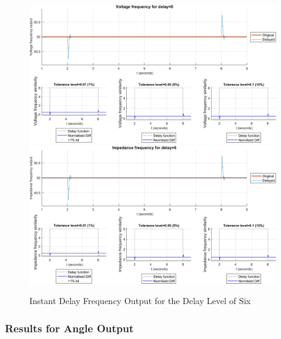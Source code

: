 \begin{figure}
    \caption{Instant Delay Frequency Output for the Delay Level of Six}
    \includegraphics[width=0.95\textwidth]{PMUsim-figures/DelayOf_6/Instant_vFrequency.png}    
    \label{fig:PMUsim_Six_vFrequency}
    \includegraphics[width=0.95\textwidth]{PMUsim-figures/DelayOf_6/Instant_iFrequency.png}    
    \label{fig:PMUsim_Six_Frequency}
        \begin{small}
     \end{small}
\end{figure}


\newpage \subsubsection{Results for Angle Output}


